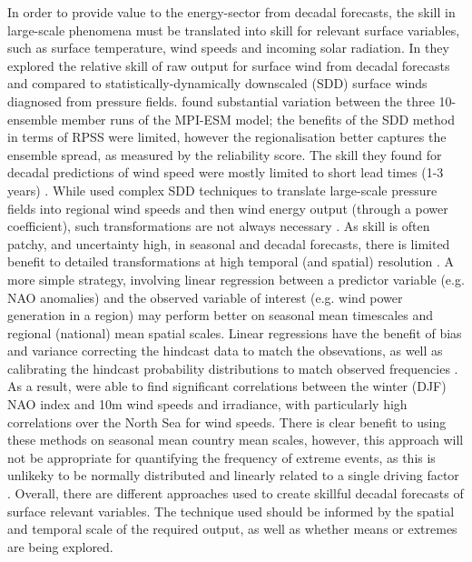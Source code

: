 \documentclass{article}
\begin{document}
In order to provide value to the energy-sector from decadal forecasts, the skill in large-scale phenomena must be translated into skill for relevant surface variables, such as surface temperature, wind speeds and incoming solar radiation. In \cite{moemken2016decadal} they explored the relative skill of raw output for surface wind from decadal forecasts and compared to statistically-dynamically downscaled (SDD) surface winds diagnosed from pressure fields. \cite{moemken2016decadal} found substantial variation between the three 10-ensemble member runs of the MPI-ESM model; the benefits of the SDD method in terms of RPSS were limited, however the regionalisation better captures the ensemble spread, as measured by the reliability score. The skill they found for decadal predictions of wind speed were mostly limited to short lead times (1-3 years) \parencite{moemken2016decadal}. While \cite{moemken2016decadal} used complex SDD techniques to translate large-scale pressure fields into regional wind speeds and then wind energy output (through a power coefficient), such transformations are not always necessary \parencite{bett2022simplified}. As skill is often patchy, and uncertainty high, in seasonal and decadal forecasts, there is limited benefit to detailed transformations at high temporal (and spatial) resolution \parencite{bett2022simplified}. A more simple strategy, involving linear regression between a predictor variable (e.g. NAO anomalies)
and the observed variable of interest (e.g. wind power generation in a region) may perform better on seasonal mean timescales and regional (national) mean spatial scales. Linear regressions have the benefit of bias and variance correcting the hindcast data to match the obsevations, as well as calibrating the hindcast probability distributions to match observed frequencies \parencite{bett2022simplified,wilks_statistical_2019}.
As a result, \cite{bett2022simplified} were able to find significant correlations between the winter (DJF) NAO index and 10m wind speeds and irradiance, with particularly high correlations over the North Sea for wind speeds. There is clear benefit to  using these methods on seasonal mean country mean scales, however, this approach will not be appropriate for quantifying the frequency of extreme events, as this is unlikeky to be normally distributed and linearly related to a single driving factor \parencite{bett2022simplified,thornton2019skilful}. Overall, there are different approaches used to create skillful decadal forecasts of surface relevant variables. The technique used should be informed by the spatial and temporal scale of the required output, as well as whether means or extremes are being explored.\\
\end{document}
